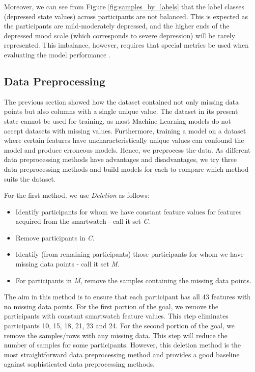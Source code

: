 Moreover, we can see from Figure \ref{fig:samples_by_labels} that the label classes (depressed state values) across participants are not balanced. This is expected as the participants are mild-moderately depressed, and the higher ends of the depressed mood scale (which corresponds to severe depression) will be rarely represented. This imbalance, however, requires that special metrics be used when evaluating the model performance \cite{fernandez_performance_2018}. 



\subsection{Data Preprocessing}
\label{sec:data_preprocessing}
The previous section showed how the dataset contained not only missing data points but also columns with a single unique value. The dataset in its present state cannot be used for training, as most Machine Learning models do not accept datasets with missing values. Furthermore, training a model on a dataset where certain features have uncharacteristically unique values can confound the model and produce erroneous models. Hence, we preprocess the data. As different data preprocessing methods have advantages and disadvantages, we try three data preprocessing methods and build models for each to compare which method suits the dataset.

For the first method, we use \emph{Deletion} as follows:
\begin{itemize}
 \item Identify participants for whom we have constant feature values for features acquired from the smartwatch - call it set \emph{C}.
 \item Remove participants in \emph{C}.
 \item Identify (from remaining participants) those participants for whom we have missing data points - call it set \emph{M}.
 \item For participants in \emph{M}, remove the samples containing the missing data points.
\end{itemize}

The aim in this method is to ensure that each participant has all 43 features with no missing data points. For the first portion of the goal, we remove the participants with constant smartwatch feature values. This step eliminates participants 10, 15, 18, 21, 23 and 24. For the second portion of the goal, we remove the samples/rows with any missing data. This step will reduce the number of samples for some participants. However, this deletion method is the most straightforward data preprocessing method and provides a good baseline against sophisticated data preprocessing methods.


